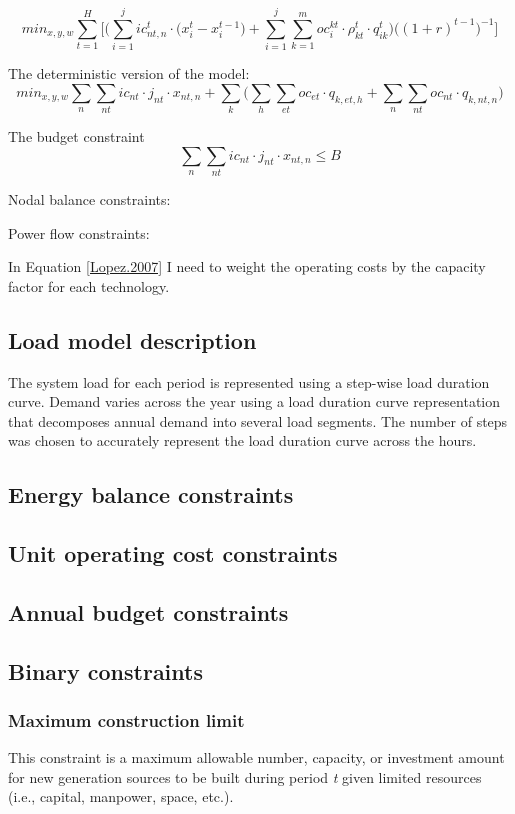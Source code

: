\documentclass[10pt]{amsart}
\begin{document}
\begin{equation}
min_{x,y,w} \sum_{t=1}^{H}\bigg[\bigg(\sum_{i=1}^{j} ic_{nt, n}^{t}\cdot \big(x_{i}^{t} - x_{i}^{t-1}\big) + \sum_{i=1}^{j} \sum_{k=1}^{m} oc_{i}^{kt}\cdot \rho_{kt}^{t}\cdot q_{ik}^{t} \bigg)\bigg((1+ r)^{t-1}\bigg)^{-1}\bigg]
\end{equation}

The deterministic version of the model: 
\begin{equation}\label{Lopez.2007}
min_{x,y,w} \sum_{n} \sum_{nt} ic_{nt}\cdot j_{nt}\cdot x_{nt, n}  + \sum_{k} \bigg(\sum_{h}\sum_{et}oc_{et}\cdot q_{k,et,h} + \sum_{n}\sum_{nt} oc_{nt}\cdot q_{k,nt,n}\bigg) 
\end{equation}

The budget constraint
\begin{equation}
\sum_{n}\sum_{nt} ic_{nt}\cdot j_{nt}\cdot x_{nt, n} \leq B
\end{equation}

Nodal balance constraints:

Power flow constraints:

In Equation \ref{Lopez.2007} I need to weight the operating costs by the capacity factor for each technology.

\subsection{Load model description}
The system load for each period is represented using a step-wise load duration curve. 
Demand varies across the year using a load duration curve representation that decomposes annual demand into several load segments. 
The number of steps was chosen to accurately represent the load duration curve across the hours.
\subsection{Energy balance constraints}
\subsection{Unit operating cost constraints}
\subsection{Annual budget constraints}
\subsection{Binary constraints}
\subsubsection{Maximum construction limit \nopunct}
This constraint is a maximum allowable number, capacity, or investment amount for new generation sources to be built during period \textit{t} given limited resources (i.e., capital, manpower, space, etc.). 
\end{document}
